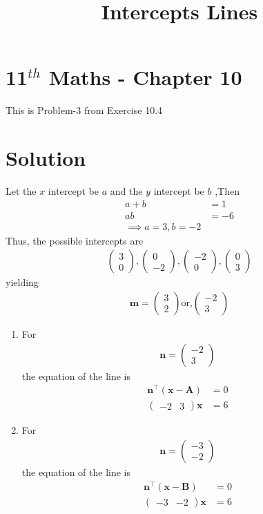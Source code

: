 \documentclass[12pt]{article}
\providecommand{\brak}[1]{\ensuremath{\left(#1\right)}}
\newcommand{\myvec}[1]{\ensuremath{\begin{pmatrix}#1\end{pmatrix}}}
\let\vec\mathbf
\begin{document}
\begin{center}
\title{\textbf{ Intercepts Lines}}
\date{\vspace{-5ex}} %
\maketitle
\end{center}
\setcounter{page}{eq:11/10/4/31}
\section*{11$^{th}$ Maths - Chapter 10}
This is Problem-3 from Exercise 10.4
\section{Solution}
\fi
Let the $x$ intercept be $a$ and  the $y$ intercept be $b$ ,Then
\begin{align}
a+b&=1\label{eq:11/10/4/31}\\
ab&=-6 \label{eq:11/10/4/32}
\\
\implies  a = 3, b = -2
\end{align}
Thus, the possible 
intercepts are
\begin{align}
\myvec{3\\0}, \myvec{0\\-2},
\myvec{-2\\0}, \myvec{0\\3}
\end{align}
yielding
\begin{align}		
\vec{m}=\myvec{3\\2} \text{or,} \myvec{-2\\3}
\end{align}
\begin{enumerate}
\item For 
\begin{align}
\vec{n}
=\myvec{-2 \\3} 
\end{align}
the equation of the line is 
\begin{align}
	\vec{n}^\top\brak{\vec{x}-\vec{A}} &= 0 \\
	\myvec { -2 & 3 } \vec{x}  &= 6  
\end{align}
\item  For 
\begin{align}
\vec{n}
=\myvec{-3 \\-2} 
\end{align}
the equation of the line is 
\begin{align}
    \vec{n}^\top\brak{\vec{x}-\vec{B}} &= 0 \\  
	\myvec { -3 & -2 }  \vec{x}  &= 6        
\end{align}
\end{enumerate}
\end{document}
